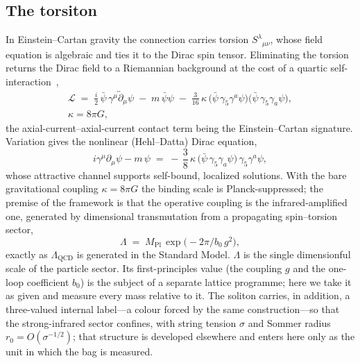 \documentclass[aps,prd,reprint,nofootinbib,superscriptaddress]{revtex4-2}
\begin{document}
\subsection{The torsiton}
\label{sec:torsiton}
In Einstein--Cartan gravity the connection carries torsion $S^{\lambda}{}_{\mu\nu}$, whose field
equation is algebraic and ties it to the Dirac spin tensor. Eliminating the torsion returns the Dirac
field to a Riemannian background at the cost of a quartic self-interaction~\citep{hehl1976,
hehldatta1971},
\begin{multline}
  \mathcal{L} \;=\; \tfrac{i}{2}\,\bar\psi\,\gamma^{\mu}\!\overleftrightarrow{\partial}_{\mu}\psi
  \;-\; m\,\bar\psi\psi
  \;-\; \frac{3}{16}\,\kappa\,\bigl(\bar\psi\,\gamma_5\gamma^{a}\psi\bigr)
        \bigl(\bar\psi\,\gamma_5\gamma_{a}\psi\bigr), \\
  \kappa = 8\pi G,
  \label{eq:lagrangian}
\end{multline}
the axial-current--axial-current contact term being the Einstein--Cartan signature. Variation gives the
nonlinear (Hehl--Datta) Dirac equation,
\begin{equation}
  i\gamma^{\mu}\partial_{\mu}\psi - m\,\psi
  \;=\; -\,\frac{3}{8}\,\kappa\,\bigl(\bar\psi\,\gamma_5\gamma_{a}\psi\bigr)\,\gamma_5\gamma^{a}\psi,
  \label{eq:hehldatta}
\end{equation}
whose attractive channel supports self-bound, localized solutions. With the bare gravitational coupling
$\kappa=8\pi G$ the binding scale is Planck-suppressed; the premise of the framework is that the
operative coupling is the infrared-amplified one, generated by dimensional transmutation from a
propagating spin--torsion sector,
\begin{equation}
  \Lambda \;=\; M_{\mathrm{Pl}}\,\exp\!\bigl(-2\pi/b_0\,g^{2}\bigr),
  \label{eq:transmutation}
\end{equation}
exactly as $\Lambda_{\mathrm{QCD}}$ is generated in the Standard Model. $\Lambda$ is the single
dimensionful scale of the particle sector. Its first-principles value (the coupling $g$ and the
one-loop coefficient $b_0$) is the subject of a separate lattice programme; here we take it as given and
measure every mass relative to it. The soliton carries, in addition, a three-valued internal label---a
colour forced by the same construction---so that the strong-infrared sector confines, with string
tension $\sigma$ and Sommer radius $r_0 = O(\sigma^{-1/2})$; that structure is developed elsewhere and
enters here only as the unit in which the bag is measured.
\end{document}
